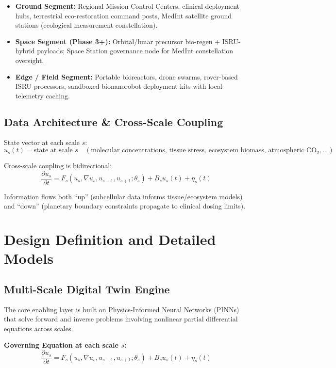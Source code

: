 \documentclass[11pt,a4paper]{report}
\begin{document}
\begin{itemize}
    \item \textbf{Ground Segment:} Regional Mission Control Centers, clinical deployment hubs, terrestrial eco-restoration command posts, MedInt satellite ground stations (ecological measurement constellation).
    \item \textbf{Space Segment (Phase 3+):} Orbital/lunar precursor bio-regen + ISRU-hybrid payloads; Space Station governance node for MedInt constellation oversight.
    \item \textbf{Edge / Field Segment:} Portable bioreactors, drone swarms, rover-based ISRU processors, sandboxed bionanorobot deployment kits with local telemetry caching.
\end{itemize}

\section{Data Architecture \& Cross-Scale Coupling}

State vector at each scale $s$:
\[ u_s(t) = \text{state at scale } s \quad (\text{molecular concentrations, tissue stress, ecosystem biomass, atmospheric } \mathrm{CO}_2, \dots) \]

Cross-scale coupling is bidirectional:
\[ \frac{\partial u_s}{\partial t} = F_s(u_s, \nabla u_s, u_{s-1}, u_{s+1}; \theta_s) + B_s u_s(t) + \eta_s(t) \]

Information flows both ``up'' (subcellular data informs tissue/ecosystem models) and ``down'' (planetary boundary constraints propagate to clinical dosing limits).

\chapter{Design Definition and Detailed Models}

\section{Multi-Scale Digital Twin Engine}

The core enabling layer is built on Physics-Informed Neural Networks (PINNs) that solve forward and inverse problems involving nonlinear partial differential equations across scales.

\textbf{Governing Equation at each scale $s$:}
\begin{equation}
\frac{\partial u_s}{\partial t} = F_s(u_s, \nabla u_s, u_{s-1}, u_{s+1}; \theta_s) + B_s u_s(t) + \eta_s(t)
\end{equation}
\end{document}
